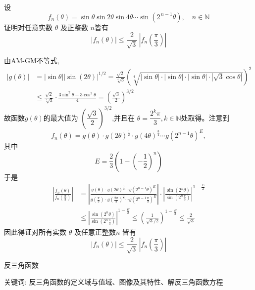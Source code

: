 \begin{questions}
    \question 设
    \[
    f_n(\theta)=\sin\theta\sin2\theta\sin4\theta\cdots\sin(2^{\,n-1}\theta), \quad n \in \mathbb{N}
    \]
    证明对任意实数 $\theta$ 及正整数 $n$皆有
    \[
    |f_n(\theta)|\le \frac{2}{\sqrt{3}}\,\left|f_n\left(\frac{\pi}{3}\right)\right|
    \]
    \begin{solution}
        由AM-GM不等式,
        \begin{align*}
        |g(\theta)| &= |\sin \theta| |\sin(2\theta)|^{1/2} = \frac{\sqrt{2}}{\sqrt[4]{3}} \left( \sqrt[4]{|\sin \theta| \cdot |\sin \theta| \cdot |\sin \theta| \cdot |\sqrt{3}\cos \theta|} \right)^2 \\
        &\le \frac{\sqrt{2}}{\sqrt[4]{3}} \cdot \frac{3 \sin^2 \theta + 3 \cos^2 \theta}{4} = \left(\frac{\sqrt{3}}{2}\right)^{3/2}
        \end{align*}
        故函数$g(\theta)$的最大值为 $\left(\dfrac{\sqrt{3}}{2}\right)^{3/2}$,并且在 $\theta=\dfrac{2^k\pi}{3},k \in \mathbb{N}$处取得。注意到
        \[
        f_n(\theta)
        = g(\theta)\cdot g(2\theta)^{\frac{1}{2}}\cdot g(4\theta)^{\frac{3}{4}}\cdots
        g(2^{n-1}\theta)^E,
        \]
        其中
        \[
        E=\frac{2}{3}\left(1-\left(-\frac{1}{2}\right)^n\right)
        \]
        于是
        \begin{align*}
        \left|\frac{f_n(\theta)}{f_n(\frac{\pi}{3})}\right|
        &=\left|\frac{g(\theta)\cdot g(2\theta)^{\frac{1}{2}}\cdots g(2^{n-1}\theta)^E}{g(\frac{\pi}{3})\cdot g(\frac{2\pi}{3})^{\frac{1}{2}}\cdots g(2^{n-1}\frac{\pi}{3})^E}\right|
        \cdot \left|\frac{\sin(2^n\theta)}{\sin(2^n\frac{\pi}{3})}\right|^{1-\frac{E}{2}}\\
        &\le \left|\frac{\sin(2^n\theta)}{\sin(2^n\frac{\pi}{3})}\right|^{1-\frac{E}{2}}
        \le \left(\frac{1}{\sqrt{3}/2}\right)^{1-\frac{E}{2}}
        \le \frac{2}{\sqrt{3}}
        \end{align*}
        因此得证对所有实数 $\theta$ 及任意正整数$n$ 皆有
        \[
        |f_n(\theta)|\le \frac{2}{\sqrt{3}}\,\left|f_n\left(\frac{\pi}{3}\right)\right|
        \]
    \end{solution}
\end{questions}
\pagebreak

\begin{center}
  {\fontsize{30pt}{26pt}\selectfont
    \hypertarget{反三角函数}{反三角函数} \label{反三角函数}
  }
\end{center}
\separator
\begin{center}
    关键词: 反三角函数的定义域与值域、图像及其特性、解反三角函数方程
\end{center}
\vspace{0.5pt}

